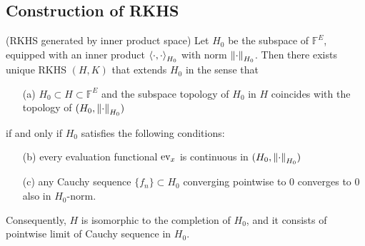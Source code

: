 \documentclass[a4paper,12pt]{article}
\begin{document}
\subsection{Construction of RKHS} \label{rkhs of a pd kernel }


\begin{thm} (RKHS generated by inner product space)\label{RKHS generated by ip sp}
	Let \( H_0 \) be the subspace of \( \mathbb{F}^E \), equipped with an inner product \( \left<\cdot , \cdot  \right>_{H_0} \) with norm \( \left\| \cdot  \right\|_{H_0} \).
	Then there exists unique RKHS \( (H,K) \) that extends \( H_0 \) in the sense that
	\begin{itemize}
		\item[(a)] \( H_0 \subset H \subset \mathbb{F}^E\) and the subspace topology of \( H_0 \) in \( H \) coincides with the topology of \( (H_0, \left\| \cdot  \right\|_{H_0}) \)
	\end{itemize}
	if and only if \( H_0 \) satisfies the following conditions:
	\begin{itemize}
		\item[(b)] every evaluation functional \( \mathrm{ev}_{x} \) is continuous in \( (H_0, \left\| \cdot  \right\|_{H_0})\)
		\item[(c)] any Cauchy sequence \( \{f_n\} \subset H_0 \) converging pointwise to 0 converges to 0 also in \( H_0 \)-norm.
	\end{itemize}
	Consequently, \( H \) is isomorphic to the completion of \( H_0 \), and it consists of pointwise limit of Cauchy sequence in \( H_0 \).
\end{thm}
\end{document}
